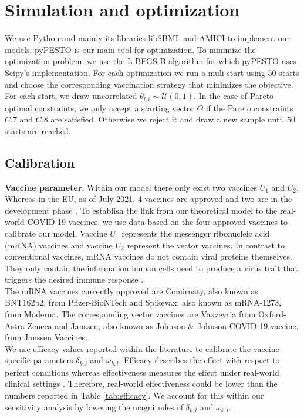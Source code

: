 \section{Simulation and optimization}

We use Python and mainly its libraries libSBML \citep{Bornstein.2008} and AMICI \citep{Frohlich.2020} to implement our models. pyPESTO \citep{pyPESTO} is our main tool for optimization. To minimize the optimization problem, we use the L-BFGS-B algorithm \citep{Zhu.1997} for which pyPESTO uses Scipy's \citep{scipy.2020} implementation. For each optimization we run a muli-start using 50 starts and choose the corresponding vaccination strategy that minimizes the objective. For each start, we draw uncorrelated $\theta_{l,i} \sim \mathcal{U}(0,1)$. In the case of Pareto optimal constraints, we only accept a starting vector $\Theta$ if the Pareto constraints $C.7$ and $C.8$ are satisfied. Otherwise we reject it and draw a new sample until 50 starts are reached.

\subsection{Calibration}
\textbf{Vaccine parameter}. Within our model there only exist two vaccines $U_1$ and $U_2$. Whereas in the EU, as of July 2021, 4 vaccines are approved and two are in the development phase \citep{EC.2021}. To establish the link from our theoretical model to the real-world COVID-19 vaccines, we use data based on the four approved vaccines to calibrate our model. Vaccine $U_1$ represents the messenger ribonucleic acid (mRNA) vaccines and vaccine $U_2$ represent the vector vaccines. In contrast to conventional vaccines, mRNA vaccines do not contain viral proteins themselves. They only contain the information human cells need to produce a virus trait that triggers the desired immune response \citep{Biontech.2021}. \\

The mRNA vaccines currently approved are Comirnaty, also known as BNT162b2, from Pfizer-BioNTech and Spikevax, also known as mRNA-1273, from Moderna. The corresponding vector vaccines are Vaxzevria from Oxford-Astra Zeneca and Janssen, also known as Johnson \& Johnson COVID-19 vaccine, from Janssen Vaccines. \\
 
We use efficacy values reported within the literature to calibrate the vaccine specific parameters $\delta_{k,l}$ and $\omega_{k,l}$. Efficacy describes the effect with respect to perfect conditions whereas effectiveness measures the effect under real-world clinical settings \citep{Gartlehner.2006}. Therefore, real-world effectiveness could be lower than the numbers reported in Table \ref{tab:efficacy}. We account for this within our sensitivity analysis by lowering the magnitudes of $\delta_{k,l}$ and $\omega_{k,l}$. \\

